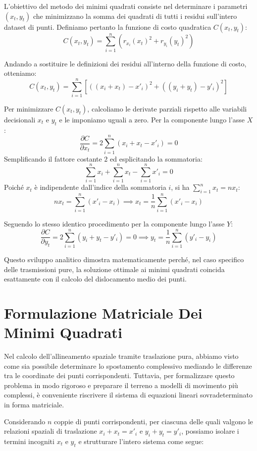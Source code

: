 ﻿\documentclass[11pt, a4paper]{article}
\begin{document}
L'obiettivo del metodo dei minimi quadrati consiste nel determinare i parametri $(x_t, y_t)$ che minimizzano la somma dei quadrati di tutti i residui sull'intero dataset di punti. Definiamo pertanto la funzione di costo quadratica $C(x_t, y_t)$:
\[
C(x_t, y_t) = \sum_{i=1}^{n} \left( r_{x_i}(x_t)^2 + r_{y_i}(y_t)^2 \right)
\]

Andando a sostituire le definizioni dei residui all'interno della funzione di costo, otteniamo:
\[
C(x_t, y_t) = \sum_{i=1}^{n} \left[ \left( (x_i + x_t) - x'_i \right)^2 + \left( (y_i + y_t) - y'_i \right)^2 \right]
\]

Per minimizzare $C(x_t, y_t)$, calcoliamo le derivate parziali rispetto alle variabili decisionali $x_t$ e $y_t$ e le imponiamo uguali a zero. Per la componente lungo l'asse $X$:
\[
\frac{\partial C}{\partial x_t} = 2 \sum_{i=1}^{n} (x_i + x_t - x'_i) = 0
\]
Semplificando il fattore costante $2$ ed esplicitando la sommatoria:
\[
\sum_{i=1}^{n} x_i + \sum_{i=1}^{n} x_t - \sum_{i=1}^{n} x'_i = 0
\]
Poiché $x_t$ è indipendente dall'indice della sommatoria $i$, si ha $\sum_{i=1}^{n} x_t = n x_t$:
\[
n x_t = \sum_{i=1}^{n} (x'_i - x_i) \implies \boxed{x_t = \frac{1}{n} \sum_{i=1}^{n} (x'_i - x_i)}
\]

Seguendo lo stesso identico procedimento per la componente lungo l'asse $Y$:
\[
\frac{\partial C}{\partial y_t} = 2 \sum_{i=1}^{n} (y_i + y_t - y'_i) = 0 \implies \boxed{y_t = \frac{1}{n} \sum_{i=1}^{n} (y'_i - y_i)}
\]

Questo sviluppo analitico dimostra matematicamente perché, nel caso specifico delle trasmissioni pure, la soluzione ottimale ai minimi quadrati coincida esattamente con il calcolo del dislocamento medio dei punti.

\section{Formulazione Matriciale Dei Minimi Quadrati}

Nel calcolo dell'allineamento spaziale tramite traslazione pura, abbiamo visto come sia possibile determinare lo spostamento complessivo mediando le differenze tra le coordinate dei punti corrispondenti. Tuttavia, per formalizzare questo problema in modo rigoroso e preparare il terreno a modelli di movimento più complessi, è conveniente riscrivere il sistema di equazioni lineari sovradeterminato in forma matriciale.

Considerando $n$ coppie di punti corrispondenti, per ciascuna delle quali valgono le relazioni spaziali di traslazione $x_i + x_t = x'_i$ e $y_i + y_t = y'_i$, possiamo isolare i termini incogniti $x_t$ e $y_t$ e strutturare l'intero sistema come segue:
\end{document}
